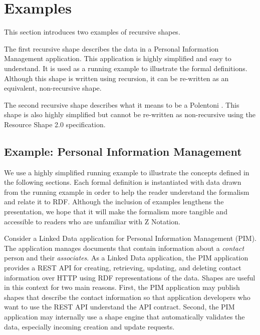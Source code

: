 \documentclass{article}
\begin{document}
\section{Examples}
\label{sec-examples}

This section introduces two examples of recursive shapes.

The first recursive shape describes the data in a Personal Information Management application.
This application is highly simplified and easy to understand. 
It is used as a running example to illustrate the formal definitions.
Although this shape is written using recursion, it can be re-written as an equivalent, non-recursive shape.

The second recursive shape describes what it means to be a Polentoni \cite{peter:polentoni}.
This shape is also highly simplified but cannot be re-written as non-recursive using the Resource Shape 2.0 specification.

\subsection{Example: Personal Information Management}
\label{sec-pim}
We use a highly simplified running example to illustrate the concepts defined in the following sections.
Each formal definition is instantiated with data drawn from the running example in order to help the reader understand the
formalism and relate it to RDF.
Although the inclusion of examples lengthens the presentation, we hope that it will make the formalism more tangible and accessible
to readers who are unfamiliar with Z Notation.

Consider a Linked Data \cite{tbl:ld} application for Personal Information Management (PIM).
The application manages documents that contain information about a {\em contact} person and their {\em associates}.
\cbstart
As a Linked Data application, the PIM application provides a REST API for creating, retrieving, updating, and deleting contact information
over HTTP using RDF representations of the data.
Shapes are useful in this context for two main reasons.
First, the PIM application may publish shapes that describe the contact information so that application developers who want to use
the REST API understand the API contract.
Second, the PIM application may internally use a shape engine that automatically validates the data, especially incoming creation and update requests.
\end{document}
